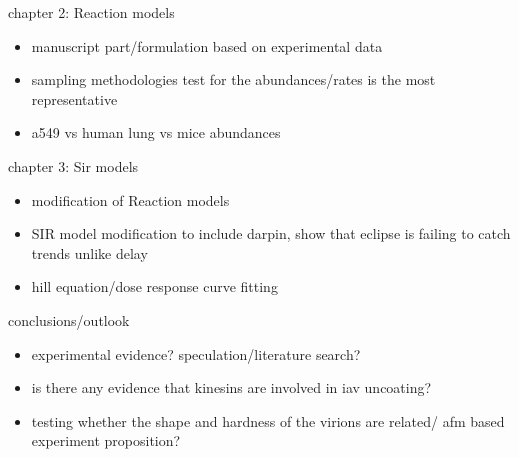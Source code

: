 chapter 2: Reaction models
\begin{itemize}
\item manuscript part/formulation based on experimental data
\item sampling methodologies test for the abundances/rates is the most representative
\item a549 vs human lung vs mice abundances
\end{itemize}

chapter 3: Sir models
\begin{itemize}
\item modification of Reaction models
\item SIR model modification to include darpin, show that eclipse is failing to catch trends unlike delay
\item hill equation/dose response curve fitting
\end{itemize}

conclusions/outlook
\begin{itemize}
\item experimental evidence? speculation/literature search?
\item is there any evidence that kinesins are involved in iav uncoating?
\item testing whether the shape and hardness of the virions are related/ afm based experiment proposition?
\end{itemize}